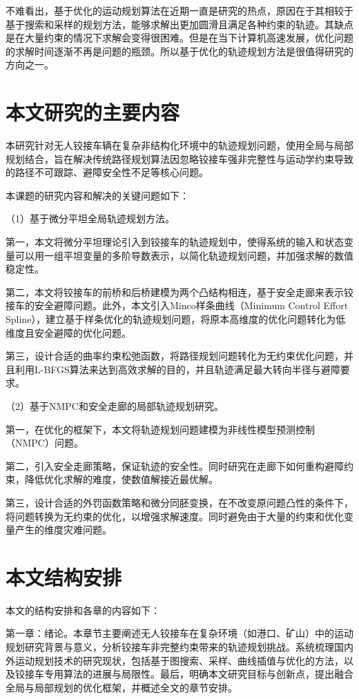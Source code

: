 \documentclass[master,academic]{ysuthesis} %
\begin{document}
	不难看出，基于优化的运动规划算法在近期一直是研究的热点，原因在于其相较于基于搜索和采样的规划方法，能够求解出更加圆滑且满足各种约束的轨迹。其缺点是在大量约束的情况下求解会变得很困难。但是在当下计算机高速发展，优化问题的求解时间逐渐不再是问题的瓶颈。所以基于优化的轨迹规划方法是很值得研究的方向之一。

	\section{本文研究的主要内容}
	本研究针对无人铰接车辆在复杂非结构化环境中的轨迹规划问题，使用全局与局部规划结合，旨在解决传统路径规划算法因忽略铰接车强非完整性与运动学约束导致的路径不可跟踪、避障安全性不足等核心问题。

	本课题的研究内容和解决的关键问题如下：

	（1）基于微分平坦全局轨迹规划方法。

	第一，本文将微分平坦理论引入到铰接车的轨迹规划中，使得系统的输入和状态变量可以用一组平坦变量的多阶导数表示，以简化轨迹规划问题，并加强求解的数值稳定性。
	
	第二，本文将铰接车的前桥和后桥建模为两个凸结构相连，基于安全走廊来表示铰接车的安全避障问题。此外，本文引入Minco样条曲线（Minimum Control Effort Spline），建立基于样条优化的轨迹规划问题，将原本高维度的优化问题转化为低维度且安全避障的优化问题。

	第三，设计合适的曲率约束松弛函数，将路径规划问题转化为无约束优化问题，并且利用L-BFGS算法来达到高效求解的目的，并且轨迹满足最大转向半径与避障要求。

	（2）基于NMPC和安全走廊的局部轨迹规划研究。

	第一，在优化的框架下，本文将轨迹规划问题建模为非线性模型预测控制（NMPC）问题。
	
	第二，引入安全走廊策略，保证轨迹的安全性。同时研究在走廊下如何重构避障约束，降低优化求解的难度，使数值解接近最优解。
	
	第三，设计合适的外罚函数策略和微分同胚变换，在不改变原问题凸性的条件下，将问题转换为无约束的优化，以增强求解速度。同时避免由于大量的约束和优化变量产生的维度灾难问题。

	\section{本文结构安排}
	本文的结构安排和各章的内容如下：

	第一章：绪论。本章节主要阐述无人铰接车在复杂环境（如港口、矿山）中的运动规划研究背景与意义，分析铰接车非完整约束带来的轨迹规划挑战。系统梳理国内外运动规划技术的研究现状，包括基于图搜索、采样、曲线插值与优化的方法，以及铰接车专用算法的进展与局限性。最后，明确本文研究目标与创新点，提出融合全局与局部规划的优化框架，并概述全文的章节安排。
\end{document}
